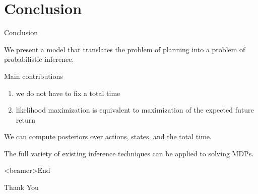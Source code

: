 \documentclass[]{beamer}
\theoremstyle{definition}
\begin{document}
\section{Conclusion}
\begin{frame}{Conclusion}
	\begin{block}{}
	    We present a model that translates the problem of planning into a problem of probabilistic inference.
	\end{block}
	\pause
	\begin{block}{Main contributions}
	     \begin{enumerate}
	         \item we do not have to fix a total time
	         \item likelihood maximization is equivalent to maximization of the expected future return
 	   \end{enumerate}
	\end{block}
	\pause
	\begin{block}{}
	     We can compute posteriors over actions, states, and the total time.
	\end{block}
	\pause
	\begin{block}{}
	     The full variety of existing inference techniques can be applied to solving MDPs.
	\end{block}
\end{frame}

\begin{frame}<beamer>{End}
	\begin{center}
		{\Huge\calligra Thank You}
	\end{center}
\end{frame}
\end{document}
